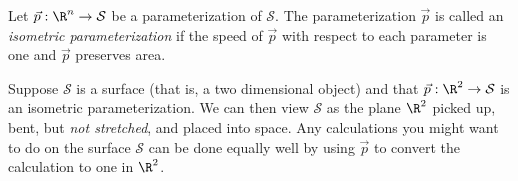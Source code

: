 \begin{definition}
	Let $\vec p:\R^n\to\mathcal S$ be a parameterization of $\mathcal S$.  The parameterization
	$\vec p$ is called an \emph{isometric parameterization} if the speed of $\vec p$ with
	respect to each parameter is one and $\vec p$ preserves area.
\end{definition}

Suppose $\mathcal S$ is a surface (that is, a two dimensional object) and that $\vec p:\R^2\to\mathcal S$
is an isometric parameterization.  We can then view $\mathcal S$ as the plane $\R^2$ picked up, bent, 
but \emph{not stretched}, and placed into space.  Any calculations you might want to do on 
the surface $\mathcal S$ can be done equally well by using $\vec p$ to convert the calculation
to one in $\R^2$.

